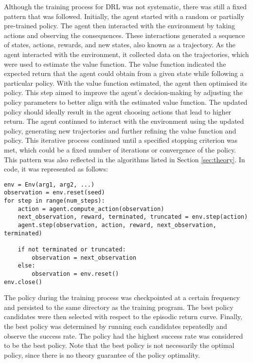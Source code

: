 Although the training process for DRL was not systematic, there was still a fixed pattern that was followed. Initially, the agent started with a random or partially pre-trained policy. The agent then interacted with the environment by taking actions and observing the consequences. These interactions generated a sequence of states, actions, rewards, and new states, also known as a trajectory. As the agent interacted with the environment, it collected data on the trajectories, which were used to estimate the value function. The value function indicated the expected return that the agent could obtain from a given state while following a particular policy. With the value function estimated, the agent then optimised its policy. This step aimed to improve the agent's decision-making by adjusting the policy parameters to better align with the estimated value function. The updated policy should ideally result in the agent choosing actions that lead to higher return. The agent continued to interact with the environment using the updated policy, generating new trajectories and further refining the value function and policy. This iterative process continued until a specified stopping criterion was met, which could be a fixed number of iterations or convergence of the policy. This pattern was also reflected in the algorithms listed in Section \ref{sec:theory}. In code, it was represented as follows:
\begin{verbatim}
env = Env(arg1, arg2, ...)
observation = env.reset(seed)
for step in range(num_steps):
    action = agent.compute_action(observation)
    next_observation, reward, terminated, truncated = env.step(action)
    agent.step(observation, action, reward, next_observation, terminated)

    if not terminated or truncated:
        observation = next_observation
    else:
        observation = env.reset()
env.close()
\end{verbatim}

The policy during the training process was checkpointed at a certain frequency and persisted to the same directory as the training program. The best policy candidates were then selected with respect to the episodic return curve. Finally, the best policy was determined by running each candidates repeatedly and observe the success rate. The policy had the highest success rate was considered to be the best policy. Note that the best policy is not necessarily the optimal policy, since there is no theory guarantee of the policy optimality.
